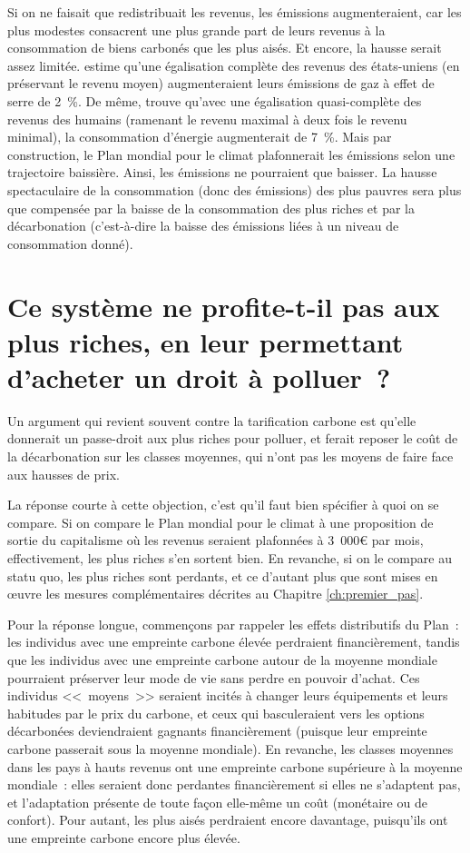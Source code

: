 \documentclass[a5paper,french]{memoir}
\begin{document}
Si on ne faisait que redistribuait les revenus, les émissions augmenteraient, car les plus modestes consacrent une plus grande part de leurs revenus à la consommation de biens carbonés que les plus aisés. Et encore, la hausse serait assez limitée. \cite{sager_income_2019} estime qu'une égalisation complète des revenus des états-uniens (en préservant le revenu moyen) augmenteraient leurs émissions de gaz à effet de serre de 2~\%. De même, \cite{oswald_global_2021} trouve qu'avec une égalisation quasi-complète des revenus des humains (ramenant le revenu maximal à deux fois le revenu minimal), la consommation d'énergie augmenterait de 7~\%. Mais par construction, le Plan mondial pour le climat plafonnerait les émissions selon une trajectoire baissière. Ainsi, les émissions ne pourraient que baisser. La hausse spectaculaire de la consommation (donc des émissions) des plus pauvres sera plus que compensée par la baisse de la consommation des plus riches et par la décarbonation (c'est-à-dire la baisse des émissions liées à un niveau de consommation donné).

\section*{\normalsize Ce système ne profite-t-il pas aux plus riches, en leur permettant d'acheter un droit à polluer~?}\label{q:riches}

Un argument qui revient souvent contre la tarification carbone est qu'elle donnerait un passe-droit aux plus riches pour polluer, et ferait reposer le coût de la décarbonation sur les classes moyennes, qui n'ont pas les moyens de faire face aux hausses de prix. 

La réponse courte à cette objection, c'est qu'il faut bien spécifier à quoi on se compare. Si on compare le Plan mondial pour le climat à une proposition de sortie du capitalisme où les revenus seraient plafonnées à 3~000\euro{} par mois, effectivement, les plus riches s'en sortent bien. En revanche, si on le compare au statu quo, les plus riches sont perdants, et ce d'autant plus que sont mises en œuvre les mesures complémentaires décrites au Chapitre \ref{ch:premier_pas}. 

Pour la réponse longue, commençons par rappeler les effets distributifs du Plan~: les individus avec une empreinte carbone élevée perdraient financièrement, tandis que les individus avec une empreinte carbone autour de la moyenne mondiale pourraient préserver leur mode de vie sans perdre en pouvoir d'achat. Ces individus <<~moyens~>> seraient incités à changer leurs équipements et leurs habitudes par le prix du carbone, et ceux qui basculeraient vers les options décarbonées deviendraient gagnants financièrement (puisque leur empreinte carbone passerait sous la moyenne mondiale). En revanche, les classes moyennes dans les pays à hauts revenus ont une empreinte carbone supérieure à la moyenne mondiale~: elles seraient donc perdantes financièrement si elles ne s'adaptent pas, et l'adaptation présente de toute façon elle-même un coût (monétaire ou de confort). Pour autant, les plus aisés perdraient encore davantage, puisqu'ils ont une empreinte carbone encore plus élevée. 
\end{document}
